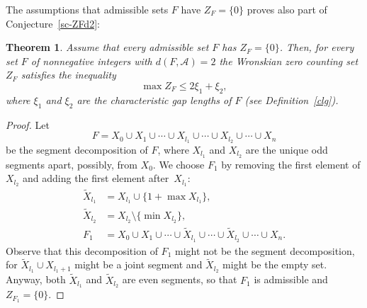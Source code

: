 \documentclass[10pt]{article}
\theoremstyle{plain}
\newtheorem{theorem}{Theorem}[section]
\theoremstyle{definition}
\numberwithin{equation}{section} %
\newcommand\Ad{\mathcal{A}}
\begin{document}
The assumptions that admissible sets $F$ have $Z_F=\{0\}$ proves also part of Conjecture~\ref{sc-ZFd2}:

\begin{theorem}
\label{dFA2}
Assume that every admissible set $F$ has $Z_F = \{0\}$. Then, for every set $F$ of nonnegative integers with $d(F,\Ad)=2$ the Wronskian zero counting set $Z_F$ satisfies the inequality
\begin{equation}
\label{maxZF}
  \max Z_F \leq  2 \xi_1 + \xi_2,
\end{equation}
where $\xi_1$ and $\xi_2$ are the characteristic gap lengths of $F$ (see Definition~\ref{clg}).
\end{theorem}

\begin{proof}
Let
\[
   F
   = X_0 \cup X_1 \cup \dotsb \cup X_{l_1} \cup \dotsb \cup X_{l_2} \cup
   \dotsb \cup X_n
\]
be the segment decomposition of $F$, where $X_{l_1}$ and $X_{l_2}$ are the unique odd segments apart, possibly, from $X_0$. We choose $F_1$ by removing the first element of $X_{l_2}$ and adding the first element after~$X_{l_1}$:
\begin{align*}
   \tilde{X}_{l_1} &= X_{l_1} \cup \{1+ \max X_{l_1}\},
   \\
   \tilde{X}_{l_2} &= X_{l_2} \setminus \{\min X_{l_2}\},
   \\
   F_1 &= X_0 \cup X_1 \cup \dotsb \cup \tilde{X}_{l_1} \cup \dotsb \cup
   \tilde{X}_{l_2} \cup \dotsb \cup X_n.
\end{align*}
Observe that this decomposition of $F_1$ might not be the segment decomposition, for $\tilde{X}_{l_1} \cup X_{l_1+1}$ might be a joint segment and $\tilde{X}_{l_2}$ might be the empty set. Anyway, both $\tilde{X}_{l_1}$ and $\tilde{X}_{l_2}$ are even segments, so that $F_1$ is admissible and $Z_{F_1} = \{0\}$.


\end{proof}
\end{document}
